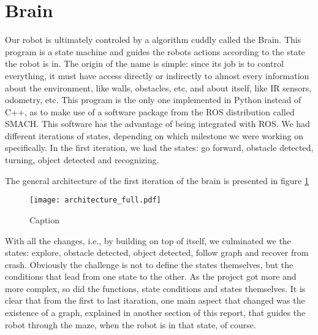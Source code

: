 \section{Brain}

Our robot is ultimately controled by a algorithm cuddly called the Brain.
This program is a state machine and guides the robots actions according to the state the robot is in.
The origin of the name is simple: since its job is to control everything, it must have access directly or indirectly to almost every information about the environment, like walls, obstacles, etc, and about itself, like IR sensors, odometry, etc.
This program is the only one implemented in Python instead of C++, as to make use of a software package from the ROS distribution called SMACH.
This software has the advantage of being integrated with ROS. 
We had different iterations of states, depending on which milestone we were working on specifically.
In the first iteration, we had the states: go forward, obstacle detected, turning, object detected and recognizing.

The general architecture of the first iteration of the brain is presented in figure \ref{fig:1st_architecture}

\begin{figure}
\centering
\texttt{[image: architecture\_full.pdf]}
\caption{Caption}
\label{fig:1st_architecture}
\end{figure}

With all the changes, i.e., by building on top of itself, we culminated we the states: explore, obstacle detected, object detected, follow graph and recover from crash.
Obviously the challenge is not to define the states themselves, but the conditions that lead from one state to the other.
As the project got more and more complex, so did the functions, state conditions and states themselves.
It is clear that from the first to last itaration, one main aspect that changed was the existence of a graph, explained in another section of this report, that guides the robot through the maze, when the robot is in that state, of course.

